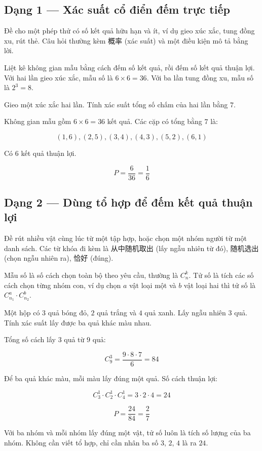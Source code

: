 \documentclass[11pt, a4paper]{article}
\begin{document}
\subsection{Dạng 1 — Xác suất cổ điển đếm trực tiếp}

 Đề cho một phép thử có số kết quả hữu hạn và ít, ví dụ gieo xúc xắc, tung đồng xu, rút thẻ. Câu hỏi thường kèm 概率 (xác suất) và một điều kiện mô tả bằng lời.

 Liệt kê không gian mẫu bằng cách đếm số kết quả, rồi đếm số kết quả thuận lợi. Với hai lần gieo xúc xắc, mẫu số là $6 \times 6 = 36$. Với ba lần tung đồng xu, mẫu số là $2^3 = 8$.

\begin{vidu}[{1}]
Gieo một xúc xắc hai lần. Tính xác suất tổng số chấm của hai lần bằng $7$.

Không gian mẫu gồm $6 \times 6 = 36$ kết quả. Các cặp có tổng bằng $7$ là:

$$(1,6), (2,5), (3,4), (4,3), (5,2), (6,1)$$

Có $6$ kết quả thuận lợi.

$$P = \frac{6}{36} = \frac{1}{6}$$

\end{vidu}
\subsection{Dạng 2 — Dùng tổ hợp để đếm kết quả thuận lợi}

 Đề rút nhiều vật cùng lúc từ một tập hợp, hoặc chọn một nhóm người từ một danh sách. Các từ khóa đi kèm là 从中随机取出 (lấy ngẫu nhiên từ đó), 随机选出 (chọn ngẫu nhiên ra), 恰好 (đúng).

 Mẫu số là số cách chọn toàn bộ theo yêu cầu, thường là $C_n^k$. Tử số là tích các số cách chọn từng nhóm con, ví dụ chọn $a$ vật loại một và $b$ vật loại hai thì tử số là $C_{n_1}^{a} \cdot C_{n_2}^{b}$.

\begin{vidu}[{2}]
Một hộp có $3$ quả bóng đỏ, $2$ quả trắng và $4$ quả xanh. Lấy ngẫu nhiên $3$ quả. Tính xác suất lấy được ba quả khác màu nhau.

Tổng số cách lấy $3$ quả từ $9$ quả:

$$C_9^3 = \frac{9 \cdot 8 \cdot 7}{6} = 84$$

Để ba quả khác màu, mỗi màu lấy đúng một quả. Số cách thuận lợi:

$$C_3^1 \cdot C_2^1 \cdot C_4^1 = 3 \cdot 2 \cdot 4 = 24$$

$$P = \frac{24}{84} = \frac{2}{7}$$

 Với ba nhóm và mỗi nhóm lấy đúng một vật, tử số luôn là tích số lượng của ba nhóm. Không cần viết tổ hợp, chỉ cần nhân ba số $3$, $2$, $4$ là ra $24$.

\end{vidu}
\end{document}
